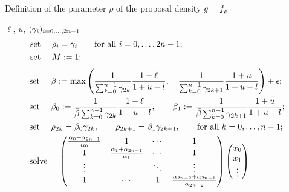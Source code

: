 \documentclass[10pt]{article}
\begin{document}
\begin{algorithm}[h]
 \caption{Definition of the parameter $\rho$ of the proposal density $\proposalDensity = \dirichletDensity[\rho]$}
 \label{algo.set_proposal_param}
 \begin{algorithmic}
  \REQUIRE $\ell$, $u$, $(\dirparam_i)_{i=0,\dots,2n-1}$ 
  \STATE \begin{equation*}
  \begin{split}
  &\text{set } \quad \rho_i = \dirparam_i \qquad \text{for all } i=0,\dots,2n-1;
  \qquad\qquad\qquad\qquad\qquad\qquad
  \\
  &\text{set } \quad M:=1;
 \end{split}  
  \end{equation*}
  \ELSE
  \STATE 
   \begin{equation*}
   \begin{split}
  &\text{set } \quad \bar{\beta} : =
   \max\left(
   \frac{1}{\sum_{k=0}^{n-1} \dirparam_{2k}}
   \frac{1-\ell}{1+u-l}, \quad
   \frac{1}{\sum_{k=0}^{n-1} \dirparam_{2k+1}}
   \frac{1+u}{1+u-l}
   \right) + \epsilon;
  \\
  &\text{set } \quad 
   \beta_0: =
   \frac{1}{\bar{\beta}\sum_{k=0}^{n-1} \dirparam_{2k}}
   \frac{1-\ell}{1+u-l},
   \qquad
   \beta_1 :=
   \frac{1}{\bar{\beta}\sum_{k=0}^{n-1} \dirparam_{2k+1}}
   \frac{1+u}{1+u-l};
  \\
  &\text{set  } \quad \rho_{2k} = \beta_0 \dirparam_{2k}, \qquad  
  \rho_{2k+1}= \beta_1 \dirparam_{2k+1}, \qquad
  \text{for all } k=0,\dots,n-1; 
  \\
  &\text{solve } \quad 
  \begin{pmatrix}
   \frac{\alpha_{0} + \alpha_{2n-1}}{\alpha_0}
   &   1   &   \cdots   &   1
   \\
   1 &
   \frac{\alpha_{1} + \alpha_{2n-1}}{\alpha_1}
   & \cdots & 1 
   \\
   \vdots & & \ddots & \vdots\\
   1 &\cdots & 1 &
   \frac{\alpha_{2n-2} + \alpha_{2n-1}}{\alpha_{2n-2}}
  \end{pmatrix}
  \begin{pmatrix}
   x_0 \\
   x_1 \\
   \vdots \\

\end{pmatrix}
\end{split}
\end{equation*}
\end{algorithmic}
\end{algorithm}
\end{document}
